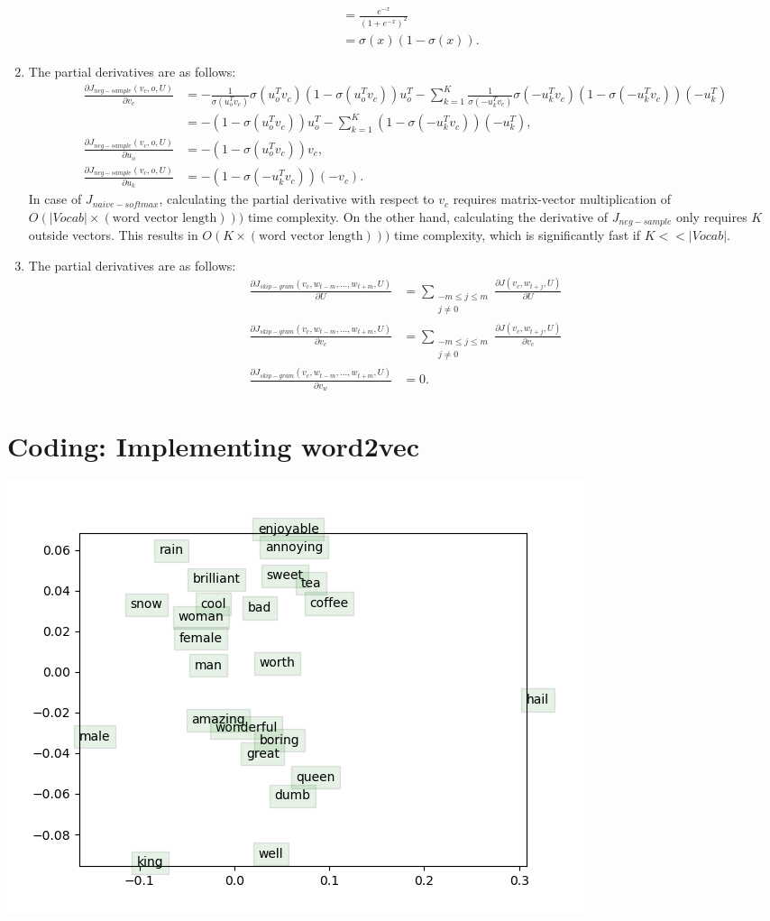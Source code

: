 \documentclass{article}
\begin{document}
\begin{enumerate}[label=(\alph*)]
\[\begin{split}
&=\frac{e^{-x}}{(1+e^{-x})^2}\\
&=\sigma(x)(1-\sigma(x)).
\end{split}
\]
\item The partial derivatives are as follows:
\[
\begin{split}
\frac{\partial J_{neg-sample}(v_c,o,U)}{\partial v_c}&=-\frac{1}{\sigma (u_o^Tv_c)}\sigma (u_o^Tv_c)(1-\sigma (u_o^Tv_c))u_o^T-\sum_{k=1}^{K}\frac{1}{\sigma (-u_k^Tv_c)}\sigma (-u_k^Tv_c)(1-\sigma (-u_k^Tv_c))(-u_k^T)\\
&=-(1-\sigma (u_o^Tv_c))u_o^T-\sum_{k=1}^{K}(1-\sigma (-u_k^Tv_c))(-u_k^T),\\
\frac{\partial J_{neg-sample}(v_c,o,U)}{\partial u_o}&=-(1-\sigma (u_o^Tv_c))v_c,\\
\frac{\partial J_{neg-sample}(v_c,o,U)}{\partial u_k}&=-(1-\sigma (-u_k^Tv_c))(-v_c).
\end{split}
\]
In case of $J_{naive-softmax}$, calculating the partial derivative with respect to $v_c$ requires matrix-vector multiplication of $O(|Vocab|\times (\text{word vector length})))$ time complexity.
On the other hand, calculating the derivative of $J_{neg-sample}$ only requires $K$ outside vectors. This results in $O(K\times (\text{word vector length})))$ time complexity, which is significantly fast if $K << |Vocab|$.
\item The partial derivatives are as follows:
\[
\begin{split}
\frac{\partial J_{skip-gram}(v_c,w_{t-m},...,w_{t+m},U)}{\partial U}&=\sum_{\substack{-m\leq j\leq m\\j\neq 0}}\frac{\partial J(v_c,w_{t+j},U)}{\partial U}\\
\frac{\partial J_{skip-gram}(v_c,w_{t-m},...,w_{t+m},U)}{\partial v_c}&=\sum_{\substack{-m\leq j\leq m\\j\neq 0}}\frac{\partial J(v_c,w_{t+j},U)}{\partial v_c}\\
\frac{\partial J_{skip-gram}(v_c,w_{t-m},...,w_{t+m},U)}{\partial v_w}&=0.
\end{split}
\]
\end{enumerate}

\section{Coding: Implementing word2vec}

\includegraphics[width=\textwidth]{word_vectors}
\end{document}
